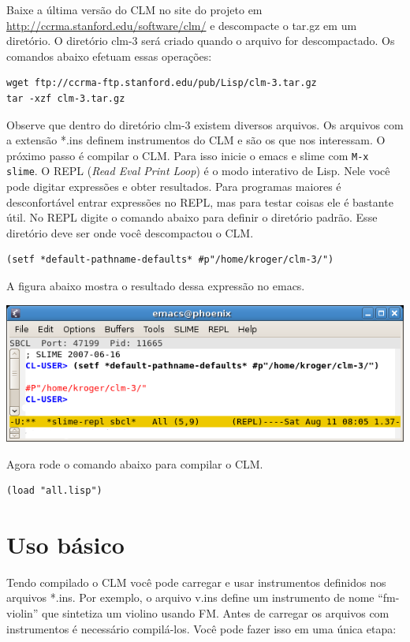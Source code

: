 \documentclass[brazil]{book}
\begin{document}
Baixe a última versão do CLM no site do projeto em
\url{http://ccrma.stanford.edu/software/clm/} e descompacte o tar.gz
em um diretório. O diretório clm-3 será criado quando o arquivo for
descompactado. Os comandos abaixo efetuam essas operações:

\begin{verbatim}
wget ftp://ccrma-ftp.stanford.edu/pub/Lisp/clm-3.tar.gz
tar -xzf clm-3.tar.gz
\end{verbatim}

Observe que dentro do diretório clm-3 existem diversos arquivos. Os
arquivos com a extensão *.ins definem instrumentos do CLM e são os que
nos interessam. O próximo passo é compilar o CLM. Para isso inicie o
emacs e slime com \texttt{M-x slime}. O REPL (\textit{Read Eval Print
  Loop}) é o modo interativo de Lisp. Nele você pode digitar
expressões e obter resultados. Para programas maiores é desconfortável
entrar expressões no REPL, mas para testar coisas ele é bastante útil.
No REPL digite o comando abaixo para definir o diretório padrão. Esse
diretório deve ser onde você descompactou o CLM.

\begin{verbatim}
(setf *default-pathname-defaults* #p"/home/kroger/clm-3/")
\end{verbatim}

A figura abaixo mostra o resultado dessa expressão no emacs.

\includegraphics{slime1}

Agora rode o comando abaixo para compilar o CLM.

\begin{verbatim}
(load "all.lisp")
\end{verbatim}

\section{Uso básico}
\label{sec:uso-basico}

Tendo compilado o CLM você pode carregar e usar instrumentos definidos
nos arquivos *.ins. Por exemplo, o arquivo v.ins define um instrumento
de nome ``fm-violin'' que sintetiza um violino usando FM. Antes de
carregar os arquivos com instrumentos é necessário compilá-los. Você
pode fazer isso em uma  única etapa:
\end{document}
